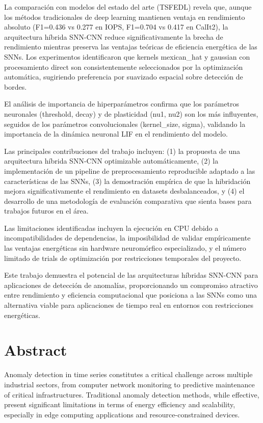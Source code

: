 La comparación con modelos del estado del arte (TSFEDL) revela que, aunque los métodos tradicionales de deep learning mantienen ventaja en rendimiento absoluto (F1=0.436 vs 0.277 en IOPS, F1=0.704 vs 0.417 en CalIt2), la arquitectura híbrida SNN-CNN reduce significativamente la brecha de rendimiento mientras preserva las ventajas teóricas de eficiencia energética de las SNNs. Los experimentos identificaron que kernels mexican\_hat y gaussian con procesamiento direct son consistentemente seleccionados por la optimización automática, sugiriendo preferencia por suavizado espacial sobre detección de bordes.

El análisis de importancia de hiperparámetros confirma que los parámetros neuronales (threshold, decay) y de plasticidad (nu1, nu2) son los más influyentes, seguidos de los parámetros convolucionales (kernel\_size, sigma), validando la importancia de la dinámica neuronal LIF en el rendimiento del modelo.

Las principales contribuciones del trabajo incluyen: (1) la propuesta de una arquitectura híbrida SNN-CNN optimizable automáticamente, (2) la implementación de un pipeline de preprocesamiento reproducible adaptado a las características de las SNNs, (3) la demostración empírica de que la hibridación mejora significativamente el rendimiento en datasets desbalanceados, y (4) el desarrollo de una metodología de evaluación comparativa que sienta bases para trabajos futuros en el área.

Las limitaciones identificadas incluyen la ejecución en CPU debido a incompatibilidades de dependencias, la imposibilidad de validar empíricamente las ventajas energéticas sin hardware neuromórfico especializado, y el número limitado de trials de optimización por restricciones temporales del proyecto.

Este trabajo demuestra el potencial de las arquitecturas híbridas SNN-CNN para aplicaciones de detección de anomalías, proporcionando un compromiso atractivo entre rendimiento y eficiencia computacional que posiciona a las SNNs como una alternativa viable para aplicaciones de tiempo real en entornos con restricciones energéticas.

\section{Abstract}

Anomaly detection in time series constitutes a critical challenge across multiple industrial sectors, from computer network monitoring to predictive maintenance of critical infrastructures. Traditional anomaly detection methods, while effective, present significant limitations in terms of energy efficiency and scalability, especially in edge computing applications and resource-constrained devices.

